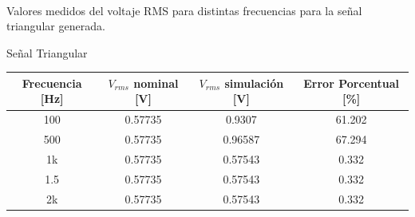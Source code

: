 \documentclass[letterpaper,11pt]{article} %
\begin{document}
\\
Valores medidos del voltaje RMS para distintas frecuencias para la señal triangular generada.  
\begin{center}
Señal Triangular
\begin{tabular}{|c|c|c|c|}
\hline
\textbf{Frecuencia [Hz]} & \textbf{$V_{rms}$ nominal [V]} & \textbf{$V_{rms}$ simulación [V]} & \textbf{Error Porcentual [\%]} \\ \hline
            100       &          0.57735                &             0.9307                    &         61.202                 \\ \hline
            500        &        0.57735                  &                  0.96587               &       67.294                    \\ \hline
               1k     &         0.57735                    &        0.57543                       &       0.332                    \\ \hline
                 1.5   &          0.57735                   &            0.57543                   &         0.332                       \\ \hline
               2k     &           0.57735                  &                0.57543                 &         0.332                       \\ \hline                 
\end{tabular}
\end{center}
\end{document}
